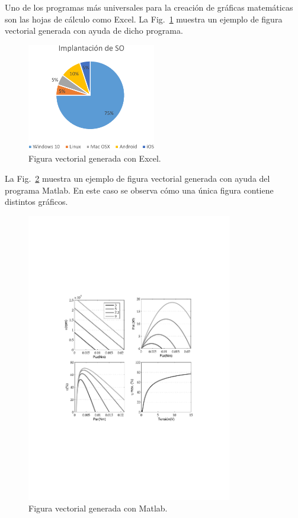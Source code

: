 \documentclass[11pt,a4paper]{article}
\begin{document}
Uno de los programas más universales para la creación de gráficas matemáticas son las hojas de cálculo como Excel. La Fig.~\ref{fig:excel} muestra un ejemplo de figura vectorial generada con ayuda de dicho programa.

\begin{figure}[H]
	\centering
	\includegraphics[width=0.5\textwidth]{EjFigsExcelOrig-crop} 
	\caption[Gráfico de Excel]{Figura vectorial generada con Excel.}
	\label{fig:excel}
\end{figure}

La Fig.~\ref{fig:matlabGrafs} muestra un ejemplo de figura vectorial generada con ayuda del programa Matlab. En este caso se observa cómo una única figura contiene distintos gráficos. %

\begin{figure}[H]
	\centering
	\includegraphics[width=0.8\textwidth]{matlabGrafs} 
	\caption[Gráfico de Matlab]{Figura vectorial generada con Matlab.}
	\label{fig:matlabGrafs}
\end{figure}
\end{document}

